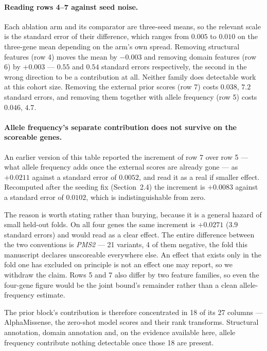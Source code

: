 \documentclass{bioinfo}
\newcommand{\gene}[1]{\textit{#1}}
\begin{document}
\paragraph{Reading rows 4--7 against seed noise.}
Each ablation arm and its comparator are three-seed means, so the relevant scale
is the standard error of their difference, which ranges from $0.005$ to $0.010$
on the three-gene mean depending on the arm's own spread. Removing structural
features (row 4) moves the mean by $-0.003$ and removing domain features (row 6)
by $+0.003$ --- $0.55$ and $0.54$ standard errors respectively, the second in the
wrong direction to be a contribution at all. Neither family does detectable work
at this cohort size. Removing the external prior scores (row 7) costs $0.038$,
$7.2$ standard errors, and removing them together with allele frequency (row 5)
costs $0.046$, $4.7$.

\paragraph{Allele frequency's separate contribution does not survive on the
scoreable genes.} An earlier version of this table reported the increment of
row 7 over row 5 --- what allele frequency adds once the external scores are
already gone --- as $+0.0211$ against a standard error of $0.0052$, and read it
as a real if smaller effect. Recomputed after the seeding fix
(Section~2.4) the increment is $+0.0083$ against a standard error of $0.0102$,
which is indistinguishable from zero.

The reason is worth stating rather than burying, because it is a general hazard
of small held-out folds. On all four genes the same increment is $+0.0271$
($3.9$ standard errors) and would read as a clear effect. The entire difference
between the two conventions is \gene{PMS2} --- 21 variants, 4 of them negative,
the fold this manuscript declares unscoreable everywhere else. An effect that
exists only in the fold one has excluded on principle is not an effect one may
report, so we withdraw the claim. Rows 5 and 7 also differ by two feature
families, so even the four-gene figure would be the joint bound's remainder
rather than a clean allele-frequency estimate.

The prior block's contribution is therefore concentrated in 18 of its 27 columns
--- AlphaMissense, the zero-shot model scores and their rank transforms.
Structural annotation, domain annotation and, on the evidence available here,
allele frequency contribute nothing detectable once those 18 are present.
\end{document}

